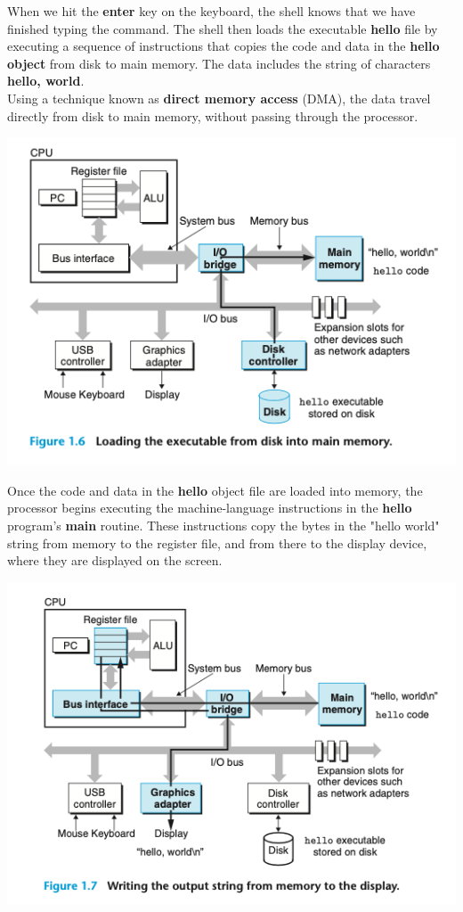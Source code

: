 \documentclass[11pt]{article}
\begin{document}
When we hit the \textbf{enter} key on the keyboard, the shell knows that we have finished typing the command. The shell then loads the executable \textbf{hello} file by executing a sequence of instructions that copies the code and data in the \textbf{hello object} from disk to main memory. The data includes the string of characters \textbf{hello, world\n}.\\

Using a technique known as \textbf{direct memory access} (DMA), the data travel directly from disk to main memory, without passing through the processor.\\

\begin{center}
\includegraphics[width=.9\linewidth]{pics/loading-from-disk-to-memory.png}
\end{center}

Once the code and data in the \textbf{hello} object file are loaded into memory, the processor begins executing the machine-language instructions in the \textbf{hello} program's \textbf{main} routine. These instructions copy the bytes in the "hello world\n" string from memory to the register file, and from there to the display device, where they are displayed on the screen.\\

\begin{center}
\includegraphics[width=.9\linewidth]{pics/write-to-display.png}
\end{center}
\end{document}
